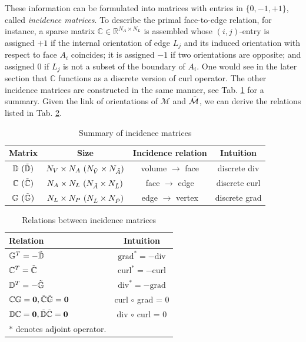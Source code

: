 \documentclass{article}
\begin{document}
These information can be formulated into matrices with entries in $\{0,-1,+1\}$, called \emph{incidence matrices}. To describe the primal face-to-edge relation, for instance, a sparse matrix $\mathbb{C} \in \mathbb{R}^{N_A \times N_L}$ is assembled whose $(i,j)$-entry is assigned $+1$ if the internal orientation of edge $L_j$ and its induced orientation with respect to face $A_i$ coincides; it is assigned $-1$ if two orientations are opposite; and assigned $0$ if $L_j$ is not a subset of the boundary of $A_i$. One would see in the later section that $\mathbb{C}$ functions as a discrete version of curl operator. The other incidence matrices are constructed in the same manner, see Tab. \ref{tab:incidence_mat} for a summary. Given the link of orientations of $\mathcal{M}$ and $\Tilde{\mathcal{M}}$, we can derive the relations listed in Tab. \ref{tab:incidence_relation}.  

\begin{table}[h!]
    \centering
    \begin{tabular}{c c c c}
    \hline
         Matrix & Size & Incidence relation & Intuition  \\
    \hline
         $\mathbb{D}\ (\Tilde{\mathbb{D}})$ & $N_V \times N_A\ (N_{\Tilde{V}} \times N_{\Tilde{A}})$ & volume $\rightarrow$ face & discrete div \\
         $\mathbb{C}\ (\Tilde{\mathbb{C}})$ & $N_A \times N_L\ (N_{\Tilde{A}} \times N_{\Tilde{L}})$ & face $\rightarrow$ edge & discrete curl \\
         $\mathbb{G}\ (\Tilde{\mathbb{G}})$ & $N_L \times N_P\ (N_{\Tilde{L}} \times N_{\Tilde{P}})$ & edge $\rightarrow$ vertex & discrete grad \\
    \hline
    \end{tabular}
    \caption{Summary of incidence matrices}
    \label{tab:incidence_mat}
\end{table}

\begin{table}[h!]
    \centering
    \begin{tabular}{l c}
    \hline
         Relation & Intuition \\
    \hline
         $\mathbb{G}^T = -\Tilde{\mathbb{D}}$  &  $\text{grad}^* = - \text{div}$\\
         $\mathbb{C}^T = \Tilde{\mathbb{C}}$   &  $\text{curl}^* = - \text{curl}$\\
         $\mathbb{D}^T = -\Tilde{\mathbb{G}}$  &  $\text{div}^* = - \text{grad}$\\
         $\mathbb{C}\mathbb{G} = \mathbf{0}, \Tilde{\mathbb{C}}\Tilde{\mathbb{G}} = \mathbf{0}$  &  curl $\circ$ grad = 0 \\
         $\mathbb{D}\mathbb{C} = \mathbf{0}, \Tilde{\mathbb{D}}\Tilde{\mathbb{C}} = \mathbf{0}$   &  div $\circ$ curl = 0 \\
    \hline
        \small $\ast$ denotes adjoint operator.
    \end{tabular}
    \caption{Relations between incidence matrices}
    \label{tab:incidence_relation}
\end{table}
\end{document}
